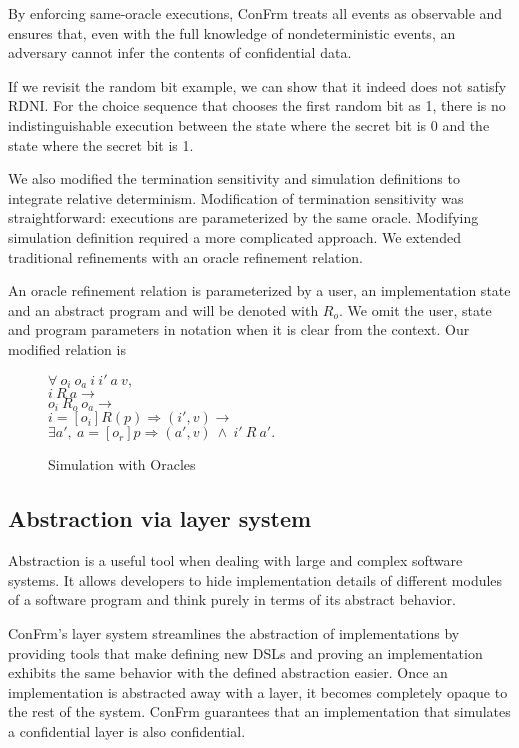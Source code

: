 By enforcing same-oracle executions, ConFrm treats all events as observable and ensures that, even with the full knowledge of nondeterministic events, an adversary cannot infer the contents of  confidential data.

If we revisit the random bit example, we can show that it indeed does not satisfy RDNI. For the choice sequence that chooses the first random bit as 1, there is no indistinguishable execution between the state where the secret bit is 0 and the state where the secret bit is 1.

We also modified the termination sensitivity and simulation definitions to integrate relative determinism. Modification of termination sensitivity was straightforward: executions are parameterized by the same oracle. Modifying simulation definition required a more complicated approach. We extended traditional refinements with an oracle refinement relation.

An oracle refinement relation is parameterized by a user, an implementation state and an abstract program and will be denoted with $R_o$. We omit the user, state and program parameters in notation when it is clear from the context. Our modified relation is

\begin{figure}[H]
$\forall\ o_i\ o_a\ i\ i'\ a\ v,$\\
$i\ R\ a \rightarrow$\\
$o_i\ R_o\ o_a \rightarrow$\\
$i =[o_i] R(p)\Rightarrow (i', v) \rightarrow$\\
$\exists a',\ a =[o_r] p\Rightarrow (a', v)\ \wedge\ i'\ R\ a'.$\\
	\caption{Simulation with Oracles}
\end{figure}

\subsection{Abstraction via layer system}
Abstraction is a useful tool when dealing with large and complex software systems.
It allows developers to hide implementation details of different modules of a software program and think purely in terms of its abstract behavior.

ConFrm's layer system streamlines the abstraction of implementations by providing tools that make defining new DSLs and proving an implementation exhibits the same behavior with the defined abstraction easier. Once an implementation is abstracted away with a layer, it becomes completely opaque to the rest of the system. ConFrm guarantees that an implementation that simulates a confidential layer is also confidential.

